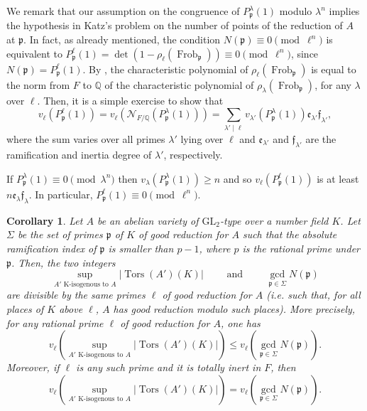 \documentclass[a4paper,11pt]{amsart}
\newtheorem{corollary}[theorem]{Corollary}
\theoremstyle{definition}
\newcommand{\Q}{\mathbb Q}
\newcommand{\p}{\mathfrak{p}}
\newcommand{\f}{\mathfrak{f}}
\newcommand{\e}{\mathfrak{e}}
\newcommand{\GL}{\text{GL}}
\DeclareMathOperator{\Frob}{Frob}
\DeclareMathOperator{\Tors}{Tors}
\begin{document}
We remark that our assumption on the congruence of \(P_\p^\lambda(1)\) modulo \(\lambda^{n}\) implies the hypothesis in Katz's problem on the number of points of the reduction of \(A\) at \(\p\). 
In fact, as already mentioned, the condition \(N(\p) \equiv 0 \pmod{\ell^n}\) is equivalent to \(P_\p^{\ell}(1)= \det(1-\rho_\ell(\Frob_\p)) \equiv 0 \pmod {\ell^n }\), since \(N(\p)=P_\p^\ell(1)\). By \cite[\S 11.9-11.10]{Shimura1967AlgebraicGroups}, the characteristic polynomial of \(\rho_\ell(\Frob_\p)\) is equal to the norm from \(F\) to \(\Q\) of the characteristic polynomial of \(\rho_{\lambda}(\Frob_\p)\), for any \(\lambda\) over \(\ell\). Then, it is a simple exercise to show that
\begin{equation} \label{eq:valuations}
    v_{\ell}(P_\p^{\ell}(1)) = v_{\ell}(\mathcal{N}_{F/\Q}(P_\p^{\lambda}(1))) = \sum_{\lambda' \mid \ell} v_{\lambda'}(P_\p^\lambda(1)) \e_{\lambda'}\f_{\lambda'},
\end{equation}
where the sum varies over all primes \(\lambda'\) lying over \(\ell\) and \(\e_{\lambda'}\) and \(\f_{\lambda'}\) are the ramification and inertia degree of \(\lambda'\), respectively. 


If \(P_\p^\lambda(1) \equiv 0 \pmod {\lambda^n}\) then \(v_{\lambda}(P_\p^\lambda(1)) \geq n\) and so \(v_{\ell}(P_\p^{\ell}(1))\) is at least \(n\e_\lambda \f_{\lambda}\). In particular, \(P_\p^{\ell}(1) \equiv 0 \pmod{\ell^n}\).

\begin{corollary}\label{cor:main}
    Let \(A\) be an abelian variety of \(\GL_2\)-type over a number field \(K\). Let \(\Sigma\) be the set of primes \(\p\) of \(K\) of good reduction for \(A\) such that the absolute ramification index of \(\p\) is smaller than \(p-1\), where \(p\) is the rational prime under \(\p\). Then, the two integers
    \[
    \sup_{A'\text{ K-isogenous to }A} |\Tors(A')(K)|\qquad \text{ and } \qquad \gcd_{\p \in \Sigma} N(\p)
    \]
    are divisible by the same primes \(\ell\) of good reduction for \(A\) (i.e. such that, for all places of \(K\) above \(\ell\), \(A\) has good reduction modulo such places). More precisely, for any rational prime \(\ell\) of good reduction for \(A\), one has
    \[
    v_\ell\left(\sup_{A'\text{ K-isogenous to }A} |\Tors(A')(K)|\right)\le v_\ell\left(\gcd_{\p \in \Sigma} N(\p)\right).
    \]
    Moreover, if \(\ell\) is any such prime and it is totally inert in \(F\), then
    \[
    v_\ell\left(\sup_{A'\text{ K-isogenous to }A} |\Tors(A')(K)|\right)=v_\ell\left(\gcd_{\p \in \Sigma} N(\p)\right).
    \]
\end{corollary}
\end{document}
